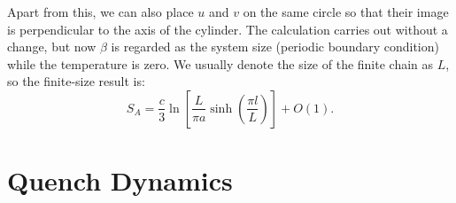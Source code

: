\documentclass[aps,prb,superscriptaddress,nofootinbib]{revtex4}
\begin{document}
Apart from this, we can also place $u$ and $v$ on the same circle so that their image is perpendicular to the axis of the cylinder.
The calculation carries out without a change, but now $\beta$ is regarded as the system size (periodic boundary condition) while the temperature is zero.
We usually denote the size of the finite chain as $L$, so the finite-size result is:
\begin{equation}
	S_A = \frac{c}{3} \ln \left[\frac{L}{\pi a}\sinh\left(\frac{\pi l}{L}\right)\right] + O(1).
\end{equation}



\section{Quench Dynamics}
\end{document}
